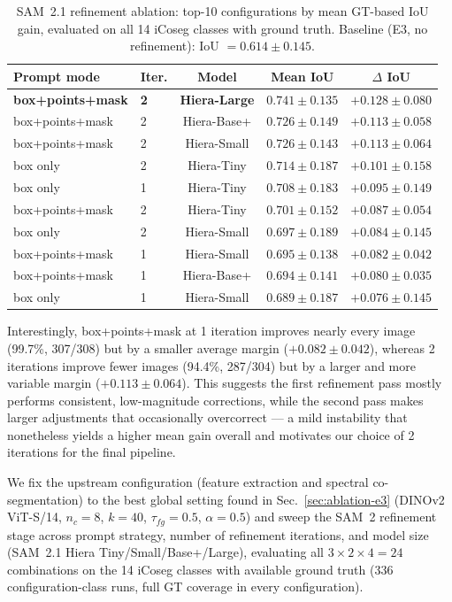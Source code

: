 \begin{table}[t]
\centering
\caption{SAM~2.1 refinement ablation: top-10 configurations by mean
GT-based IoU gain, evaluated on all 14 iCoseg classes with ground
truth. Baseline (E3, no refinement): IoU $= 0.614 \pm 0.145$.}
\label{tab:ablation-e4}
\begin{tabular}{@{}llccc@{}}
\toprule
Prompt mode & Iter. & Model & Mean IoU & $\Delta$ IoU \\
\midrule
\textbf{box+points+mask} & \textbf{2} & \textbf{Hiera-Large} & $\mathbf{0.741\pm0.135}$ & $\mathbf{+0.128\pm0.080}$ \\
box+points+mask & 2 & Hiera-Base+ & $0.726\pm0.149$ & $+0.113\pm0.058$ \\
box+points+mask & 2 & Hiera-Small & $0.726\pm0.143$ & $+0.113\pm0.064$ \\
box only        & 2 & Hiera-Tiny  & $0.714\pm0.187$ & $+0.101\pm0.158$ \\
box only        & 1 & Hiera-Tiny  & $0.708\pm0.183$ & $+0.095\pm0.149$ \\
box+points+mask & 2 & Hiera-Tiny  & $0.701\pm0.152$ & $+0.087\pm0.054$ \\
box only        & 2 & Hiera-Small & $0.697\pm0.189$ & $+0.084\pm0.145$ \\
box+points+mask & 1 & Hiera-Small & $0.695\pm0.138$ & $+0.082\pm0.042$ \\
box+points+mask & 1 & Hiera-Base+ & $0.694\pm0.141$ & $+0.080\pm0.035$ \\
box only        & 1 & Hiera-Small & $0.689\pm0.187$ & $+0.076\pm0.145$ \\
\bottomrule
\end{tabular}
\end{table}

Interestingly, box+points+mask at 1 iteration improves nearly every
image (99.7\%, 307/308) but by a smaller average margin
($+0.082 \pm 0.042$), whereas 2 iterations improve fewer images
(94.4\%, 287/304) but by a larger and more variable margin
($+0.113 \pm 0.064$). This suggests the first refinement pass mostly
performs consistent, low-magnitude corrections, while the second
pass makes larger adjustments that occasionally overcorrect —
a mild instability that nonetheless yields a higher mean gain overall
and motivates our choice of 2 iterations for the final pipeline.

We fix the upstream configuration (feature extraction and spectral
co-segmentation) to the best global setting found in
Sec.~\ref{sec:ablation-e3} (DINOv2 ViT-S/14, $n_c{=}8$, $k{=}40$,
$\tau_{fg}{=}0.5$, $\alpha{=}0.5$) and sweep the SAM~2 refinement
stage across prompt strategy, number of refinement iterations, and
model size (SAM~2.1 Hiera Tiny/Small/Base+/Large), evaluating all
$3\times2\times4=24$ combinations on the 14 iCoseg classes with
available ground truth (336 configuration-class runs, full GT
coverage in every configuration).


